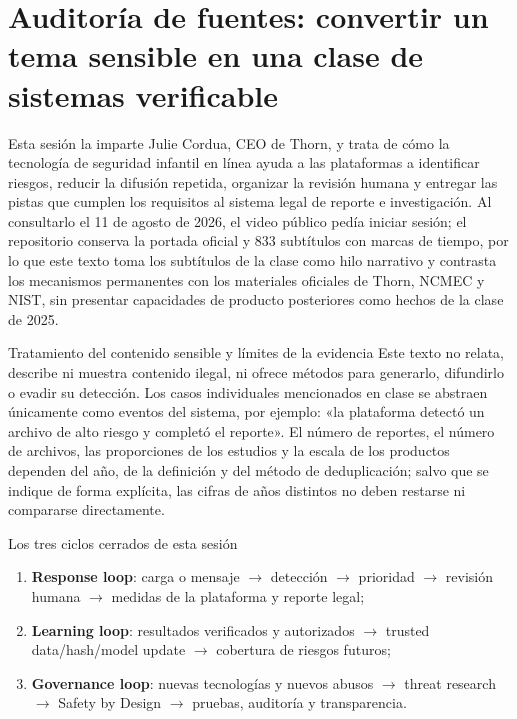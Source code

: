 \section{Auditoría de fuentes: convertir un tema sensible en una clase de sistemas verificable}

Esta sesión la imparte Julie Cordua, CEO de Thorn, y trata de cómo la tecnología de seguridad infantil en línea ayuda a las plataformas a identificar riesgos, reducir la difusión repetida, organizar la revisión humana y entregar las pistas que cumplen los requisitos al sistema legal de reporte e investigación. Al consultarlo el 11 de agosto de 2026, el video público pedía iniciar sesión; el repositorio conserva la portada oficial y 833 subtítulos con marcas de tiempo, por lo que este texto toma los subtítulos de la clase como hilo narrativo y contrasta los mecanismos permanentes con los materiales oficiales de Thorn, NCMEC y NIST, sin presentar capacidades de producto posteriores como hechos de la clase de 2025.

\begin{warningbox}{Tratamiento del contenido sensible y límites de la evidencia}
Este texto no relata, describe ni muestra contenido ilegal, ni ofrece métodos para generarlo, difundirlo o evadir su detección. Los casos individuales mencionados en clase se abstraen únicamente como eventos del sistema, por ejemplo: «la plataforma detectó un archivo de alto riesgo y completó el reporte». El número de reportes, el número de archivos, las proporciones de los estudios y la escala de los productos dependen del año, de la definición y del método de deduplicación; salvo que se indique de forma explícita, las cifras de años distintos no deben restarse ni compararse directamente.
\end{warningbox}

\begin{importantbox}{Los tres ciclos cerrados de esta sesión}
\begin{enumerate}
  \item \textbf{Response loop}: carga o mensaje $\rightarrow$ detección $\rightarrow$ prioridad $\rightarrow$ revisión humana $\rightarrow$ medidas de la plataforma y reporte legal;
  \item \textbf{Learning loop}: resultados verificados y autorizados $\rightarrow$ trusted data/hash/model update $\rightarrow$ cobertura de riesgos futuros;
  \item \textbf{Governance loop}: nuevas tecnologías y nuevos abusos $\rightarrow$ threat research $\rightarrow$ Safety by Design $\rightarrow$ pruebas, auditoría y transparencia.
\end{enumerate}
\end{importantbox}

